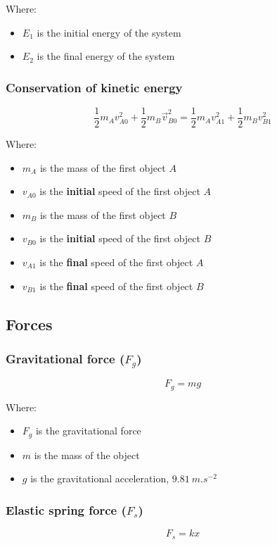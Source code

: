 \documentclass[11pt]{article}
\begin{document}
Where:
\begin{itemize}
\item \(E_1\) is the initial energy of the system
\item \(E_2\) is the final energy of the system
\end{itemize}
\subsubsection{Conservation of kinetic energy}
\label{sec:org7c0c41b}
\[\frac{1}{2} m_A v_{A0}^2 + \frac{1}{2} m_B \vec{v}_{B0}^2 = \frac{1}{2} m_A v_{A1}^2 + \frac{1}{2} m_B v_{B1}^2\]

Where:
\begin{itemize}
\item \(m_A\) is the mass of the first object \(A\)
\item \(v_{A0}\) is the \textbf{initial} speed of the first object \(A\)
\item \(m_B\) is the mass of the first object \(B\)
\item \(v_{B0}\) is the \textbf{initial} speed of the first object \(B\)
\item \(v_{A1}\) is the \textbf{final} speed of the first object \(A\)
\item \(v_{B1}\) is the \textbf{final} speed of the first object \(B\)
\end{itemize}
\subsection{Forces}
\label{sec:org53635b8}

\subsubsection{Gravitational force (\(F_g\))}
\label{sec:org27af206}
\[F_g = mg\]

Where:
\begin{itemize}
\item \(F_g\) is the gravitational force
\item \(m\) is the mass of the object
\item \(g\) is the gravitational acceleration, \(\qty{9.81}{m.s^{-2}}\)
\end{itemize}
\subsubsection{Elastic spring force (\(F_s\))}
\label{sec:org85c1be4}
\[F_s = kx\]
\end{document}
